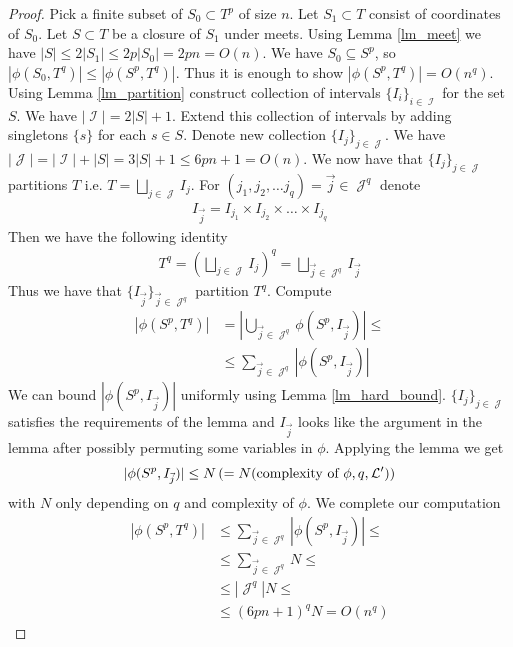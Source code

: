 \documentclass{amsart}
\DeclareMathOperator{\I}{\mathcal I}
\DeclareMathOperator{\J}{\mathcal J}
\begin{document}
\begin{proof}
	Pick a finite subset of $S_0 \subset T^p$ of size $n$. Let $S_1 \subset T$ consist of coordinates of $S_0$. Let $S \subset T$ be a closure of $S_1$ under meets. Using Lemma \ref{lm_meet} we have $|S| \leq 2|S_1| \leq 2p|S_0| = 2pn = O(n)$. We have $S_0 \subseteq S^p$, so $|\phi(S_0, T^q)| \leq |\phi(S^p, T^q)|$. Thus it is enough to show $|\phi(S^p, T^q)| = O(n^q)$.
	Using Lemma \ref{lm_partition} construct collection of intervals $\{I_i\}_{i \in \I}$ for the set $S$. We have $|\I| = 2|S| + 1$. Extend this collection of intervals by adding singletons $\{s\}$ for each $s \in S$. Denote new collection $\{I_j\}_{j \in \J}$. We have $|\J| = |\I| + |S| = 3|S| + 1 \leq 6pn + 1 = O(n)$. We now have that $\{I_j\}_{j \in \J}$ partitions $T$ i.e. $T = \bigsqcup_{j \in \J} I_j$.
	For $(j_1, j_2, \ldots j_q) = \vec j \in \J^q$ denote 
	\begin{align*}
		I_{\vec j} = I_{j_1} \times I_{j_2} \times \ldots \times I_{j_q}
	\end{align*}
	Then we have the following identity
	\begin{align*}
		T^q = (\bigsqcup_{j \in \J} I_j)^q = \bigsqcup_{\vec j \in \J^q} I_{\vec j}
	\end{align*}
	Thus we have that $\{I_{\vec j}\}_{\vec j \in \J^q}$ partition $T^q$. Compute
	\begin{align*}
		|\phi(S^p, T^q)|
		&= \left|\bigcup_{\vec j \in \J^q} \phi(S^p, I_{\vec j}) \right| \leq \\
		&\leq \sum_{\vec j \in \J^q} |\phi(S^p, I_{\vec j})|
	\end{align*}
	We can bound $|\phi(S^p, I_{\vec j})|$ uniformly using Lemma \ref{lm_hard_bound}. $\{I_j\}_{j \in \J}$ satisfies the requirements of the lemma and $I_{\vec j}$ looks like the argument in the lemma after possibly permuting some variables in $\phi$. Applying the lemma we get
	\begin{align*}
		|\phi(S^p, I_{\vec j})| \leq N \left(= N(\text{complexity of $\phi$}, q, \mathcal L')\right)
	\end{align*}
	with $N$ only depending on $q$ and complexity of $\phi$. We complete our computation
	\begin{align*}
		|\phi(S^p, T^q)|
		&\leq \sum_{\vec j \in \J^q} |\phi(S^p, I_{\vec j})| \leq \\
		&\leq \sum_{\vec j \in \J^q} N \leq \\
		&\leq |\J^q| N \leq \\
		&\leq (6pn + 1)^q N = O(n^q)
	\end{align*}
	\end{proof}
\end{document}
